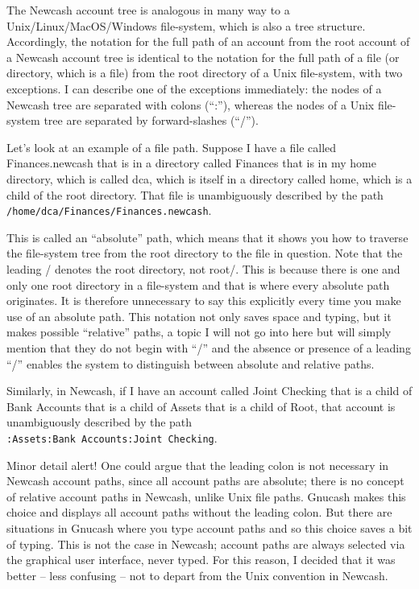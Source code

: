 \documentclass{report}
\begin{document}
The Newcash account tree is analogous in many way to a Unix/\linebreak[0]Linux/\linebreak[0]MacOS/\linebreak[0]Windows file-system, which is also a tree structure. Accordingly, the notation for the full path of an account from the root account of a Newcash account tree is identical to the notation for the full path of a file (or directory, which is a file) from the root directory of a Unix file-system, with two exceptions. I can describe one of the exceptions immediately: the nodes of a Newcash tree are separated with colons (``:''), whereas the nodes of a Unix file-system tree are separated by forward-slashes (``/''). 

Let's look at an example of a file path. Suppose I have a file called Finances.newcash that is in a directory called Finances that is in my home directory, which is called dca, which is itself in a directory called home, which is a child of the root directory. That file is unambiguously described by the path \verb|/home/dca/Finances/Finances.newcash|.

This is called an ``absolute'' path, which means that it shows you how to traverse the file-system tree from the root directory to the file in question. Note that the leading / denotes the root directory, not root/. This is because there is one and only one root directory in a file-system and that is where every absolute path originates. It is therefore unnecessary to say this explicitly every time you make use of an absolute path. This notation not only saves space and typing, but it makes possible ``relative'' paths, a topic I will not go into here but will simply mention that they do not begin with ``/'' and the absence or presence of a leading ``/'' enables the system to distinguish between absolute and relative paths.

Similarly, in Newcash, if I have an account called Joint Checking that is a child of Bank Accounts that is a child of Assets that is a child of Root, that account is unambiguously described by the path
\\\verb|:Assets:Bank Accounts:Joint Checking|.

Minor detail alert! One could argue that the leading colon is not necessary in Newcash account paths, since all account paths are absolute; there is no concept of relative account paths in Newcash, unlike Unix file paths. Gnucash makes this choice and displays all account paths without the leading colon. But there are situations in Gnucash where you type account paths and so this choice saves a bit of typing. This is not the case in Newcash; account paths are always selected via the graphical user interface, never typed. For this reason, I decided that it was better -- less confusing -- not to depart from the Unix convention in Newcash.
\end{document}
